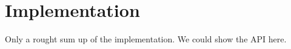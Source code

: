 \chapter{Implementation}
\label{cha:implementation}

Only a rought sum up of the implementation. We could show the API here.
